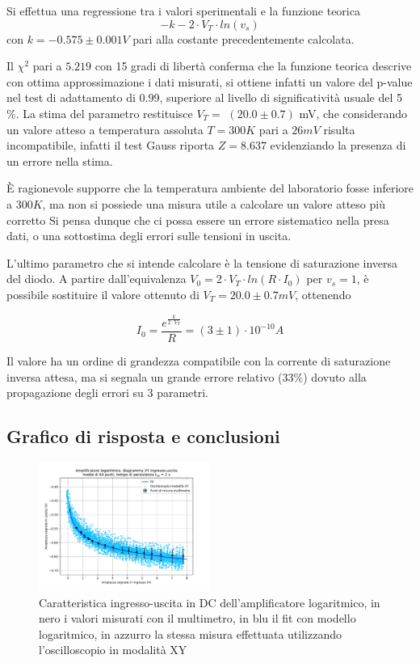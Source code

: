\documentclass[journal]{IEEEtran}
\begin{document}
Si effettua una regressione tra i valori sperimentali e la funzione teorica 
\begin{equation}
-k - 2 \cdot V_T \cdot ln(v_s)
\end{equation}
con $k = -0.575 \pm 0.001 V$ pari alla costante precedentemente calcolata.

Il $\chi^2$ pari a $5.219$ con 15 gradi di libertà conferma che la funzione teorica descrive con ottima approssimazione i dati misurati, si ottiene infatti un valore del p-value nel test di adattamento di 0.99, superiore al livello di significatività usuale del 5 \%.
La stima del parametro restituisce $V_T =$ $(20.0 \pm 0.7)$ mV, che considerando un valore atteso a temperatura assoluta $T = 300K$ pari a $26 mV$ risulta incompatibile, infatti il test Gauss riporta $Z = 8.637$ evidenziando la presenza di un errore nella stima.

È ragionevole supporre che la temperatura ambiente del laboratorio fosse inferiore a $300 K$, ma non si possiede una misura utile a calcolare un valore atteso più corretto
Si pensa dunque che ci possa essere un errore sistematico nella presa dati, o una sottostima degli errori sulle tensioni in uscita. 

L'ultimo parametro che si intende calcolare è la tensione di saturazione inversa del diodo.
A partire dall'equivalenza $V_0 = 2 \cdot V_T \cdot ln(R \cdot I_0)$  per $v_s = 1$, è possibile sostituire il valore ottenuto di $V_T = 20.0 \pm 0.7 mV$, ottenendo

\[ I_0 = \frac{e^{\frac{k}{2 \cdot V_T}}}{R} = (3 \pm 1) \cdot 10^{-10} A \]

Il valore ha un ordine di grandezza compatibile con la corrente di saturazione inversa attesa, ma si segnala un grande errore relativo ($33 \% $) dovuto alla propagazione degli errori su 3 parametri.


\subsection{Grafico di risposta e conclusioni}

\begin{figure}[H]%
\begin{center}
\includegraphics[trim = {10px 0 0 0}, width=0.50\textwidth]{analysis/output/OPA-log-fitted.pdf}
\caption{Caratteristica ingresso-uscita in DC dell'amplificatore logaritmico, in nero i valori misurati con il multimetro, in blu il fit con modello logaritmico, in azzurro la stessa misura effettuata utilizzando l'oscilloscopio in modalità XY}
\label{fig:log_ampl_fit_xy}
\end{center}
\end{figure}
\end{document}
